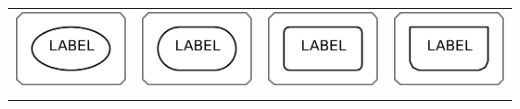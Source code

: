 \begin{table}[h]
\begin{tabu}{X[c,m]X[c,m]X[c,m]X[c,m]}
    \toprule
    \includegraphics[scale=0.8, valign=m]{images/build/unspecified_subunit.pdf} & \includegraphics[scale=0.8, valign=m]{images/build/simple_chemical_subunit.pdf} & \includegraphics[scale=0.8, valign=m]{images/build/macromolecule_subunit.pdf} & \includegraphics[scale=0.8, valign=m]{images/build/genetic_subunit.pdf}\\[0.2cm]
     &  &  & \\[0.5cm]

\end{tabu}
\end{table}
